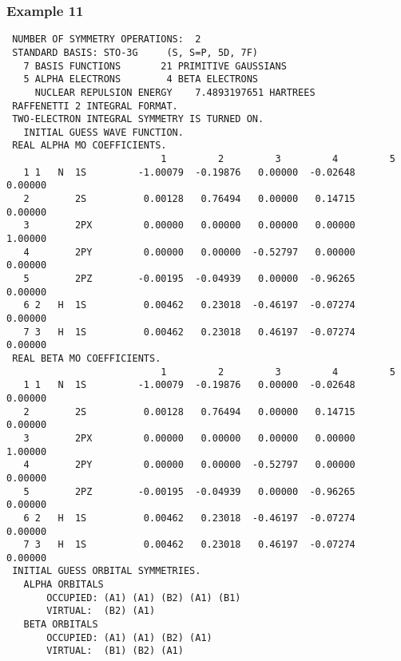 \subsubsection{\sf Example 11}
{\small
\begin{verbatim}
 NUMBER OF SYMMETRY OPERATIONS:  2
 STANDARD BASIS: STO-3G     (S, S=P, 5D, 7F)
   7 BASIS FUNCTIONS       21 PRIMITIVE GAUSSIANS
   5 ALPHA ELECTRONS        4 BETA ELECTRONS
     NUCLEAR REPULSION ENERGY    7.4893197651 HARTREES
 RAFFENETTI 2 INTEGRAL FORMAT.
 TWO-ELECTRON INTEGRAL SYMMETRY IS TURNED ON.
   INITIAL GUESS WAVE FUNCTION.
 REAL ALPHA MO COEFFICIENTS.
                           1         2         3         4         5
   1 1   N  1S         -1.00079  -0.19876   0.00000  -0.02648   0.00000
   2        2S          0.00128   0.76494   0.00000   0.14715   0.00000
   3        2PX         0.00000   0.00000   0.00000   0.00000   1.00000
   4        2PY         0.00000   0.00000  -0.52797   0.00000   0.00000
   5        2PZ        -0.00195  -0.04939   0.00000  -0.96265   0.00000
   6 2   H  1S          0.00462   0.23018  -0.46197  -0.07274   0.00000
   7 3   H  1S          0.00462   0.23018   0.46197  -0.07274   0.00000
 REAL BETA MO COEFFICIENTS.
                           1         2         3         4         5
   1 1   N  1S         -1.00079  -0.19876   0.00000  -0.02648   0.00000
   2        2S          0.00128   0.76494   0.00000   0.14715   0.00000
   3        2PX         0.00000   0.00000   0.00000   0.00000   1.00000
   4        2PY         0.00000   0.00000  -0.52797   0.00000   0.00000
   5        2PZ        -0.00195  -0.04939   0.00000  -0.96265   0.00000
   6 2   H  1S          0.00462   0.23018  -0.46197  -0.07274   0.00000
   7 3   H  1S          0.00462   0.23018   0.46197  -0.07274   0.00000
 INITIAL GUESS ORBITAL SYMMETRIES.
   ALPHA ORBITALS
       OCCUPIED: (A1) (A1) (B2) (A1) (B1)
       VIRTUAL:  (B2) (A1)
   BETA ORBITALS
       OCCUPIED: (A1) (A1) (B2) (A1)
       VIRTUAL:  (B1) (B2) (A1)
\end{verbatim}
}
\newpage
